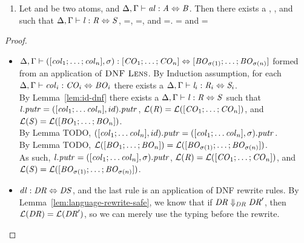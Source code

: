 \begin{lemma}
\begin{enumerate}
\item Let \Atom{} and \AtomAlt{} be two atoms, and $\Delta, \Gamma \vdash \mathit{al} : \mathit{A} \Leftrightarrow \mathit{B}$.  Then there exists a \Lens{}, \Regex{}, and \RegexAlt{} such that $\Delta, \Gamma \vdash \mathit{l} : \mathit{R} \Leftrightarrow \mathit{S}$, \PutRightOf{\Lens}=\PutRightOf{\AtomLens}, \LanguageOf{\Regex}=\LanguageOf{\Atom}, and \LanguageOf{\RegexAlt}=\LanguageOf{\AtomAlt}.  \LanguageOf{\Regex{}} = \LanguageOf{\Atom{}} and
\LanguageOf{\RegexAlt{}} = \LanguageOf{\AtomAlt{}}
\end{enumerate}
\begin{proof}
\begin{itemize}\leavevmode\\
\item $\Delta, \Gamma \vdash ([\mathit{col}_1;\ldots;\mathit{col}_n],\sigma) : [\mathit{CO}_1;\ldots;\mathit{CO}_n] \Leftrightarrow [\mathit{BO}_{\sigma(1)};\ldots;\mathit{BO}_{\sigma(n)}]$ formed from an application of $\textsc{DNF Lens}$.
By Induction assumption, for each $\Delta, \Gamma \vdash \mathit{col}_i : \mathit{CO}_i \Leftrightarrow \mathit{BO}_i$ there exists a $\Delta, \Gamma \vdash \mathit{l}_i : \mathit{R}_i \Leftrightarrow \mathit{S}_i$.\\
By Lemma~\ref{lem:id-dnf} there exists a $\Delta, \Gamma \vdash \mathit{l} : \mathit{R} \Leftrightarrow \mathit{S}$ such that $\mathit{l}.\mathit{putr}=([\mathit{col}_1;\ldots\mathit{col}_n],id).\mathit{putr}$,
$\mathcal{L}(\mathit{R})=\mathcal{L}([\mathit{CO}_1;\ldots;\mathit{CO}_n])$, and
$\mathcal{L}(\mathit{S})=\mathcal{L}([\mathit{BO}_1;\ldots;\mathit{BO}_n])$.\\
By Lemma TODO, $([\mathit{col}_1;\ldots\mathit{col}_n],id).\mathit{putr}=([\mathit{col}_1;\ldots\mathit{col}_n],\sigma).\mathit{putr}$.\\
By Lemma TODO, $\mathcal{L}([\mathit{BO}_1;\ldots;\mathit{BO}_n])=\mathcal{L}([\mathit{BO}_{\sigma(1)};\ldots;\mathit{BO}_{\sigma(n)}])$.\\
As such, $\mathit{l}.\mathit{putr}=([\mathit{col}_1;\ldots\mathit{col}_n],\sigma).\mathit{putr}$,
$\mathcal{L}(\mathit{R})=\mathcal{L}([\mathit{CO}_1;\ldots;\mathit{CO}_n])$,
and $\mathcal{L}(\mathit{S})=\mathcal{L}([\mathit{BO}_{\sigma(1)};\ldots;\mathit{BO}_{\sigma(n)}])$.\\

\item $\mathit{dl} : \mathit{DR} \Leftrightarrow \mathit{DS}$, and the last rule
is an application of DNF rewrite rules.  By Lemma~\ref{lem:language-rewrite-safe},
we know that if $\mathit{DR}\Downarrow_{\mathit{DR}}\mathit{DR}'$, then
$\mathcal{L}(\mathit{DR})=\mathcal{L}(\mathit{DR}')$,
so we can merely use the typing before the rewrite.


\end{itemize}
\end{proof}
\end{lemma}
